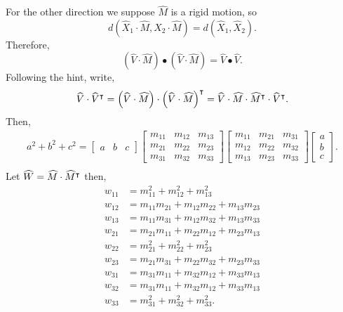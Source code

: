 \documentclass{ximera}
\begin{document}
\begin{problem}
\begin{freeResponse}
For the other direction we suppose $\hat{M}$ is a rigid motion, so
\[
 d\left( \hat{X}_{1}  \cdot\hat{M},\hat{X}_{2}
   \cdot\hat{M}\right) = d\left(  \hat{X}_{1},\hat{X}_{2}\right).
\]
Therefore, 
\[
	\left(  \hat{V}  \cdot\hat{M} \right) \bullet\left(
    \hat{V}  \cdot\hat{M}\right)  =\hat{V}\bullet\hat{V}.
 \]
Following the hint, write,
\[
\widehat{V}\cdot\widehat{V}^\intercal= \left(  \widehat{V}  \cdot\widehat{M} \right) \cdot\left(
    \widehat{V}  \cdot\widehat{M}\right)^\intercal  = \widehat{V} \cdot\widehat{M} \cdot \widehat{M}^\intercal \cdot \widehat{V}^\intercal .
\]
Then, 
\begin{align*}
a^2 + b^2 +c^2
=
\begin{bmatrix}
      a & b & c
    \end{bmatrix}
\begin{bmatrix}
	m_{11} & m_{12} & m_{13}\\
	m_{21} & m_{22} & m_{23}\\
	m_{31} & m_{32} & m_{33}
\end{bmatrix}
\begin{bmatrix}
	m_{11} & m_{21} & m_{31}\\
	m_{12} & m_{22} & m_{32}\\
	m_{13} & m_{23} & m_{33}
\end{bmatrix}
\begin{bmatrix}
      a \\
      b \\
      c
    \end{bmatrix}. \\
 \end{align*}
 Let $\widehat{W} = \widehat{M} \cdot \widehat{M}^\intercal$ then,
 \begin{align*}
 w_{11} &= m_{11}^2 + m_{12}^2 +  m_{13}^2 \\
 w_{12} &= m_{11}m_{21} + m_{12}m_{22} +m_{13}m_{23}\\
 w_{13} &= m_{11}m_{31} + m_{12}m_{32} +m_{13}m_{33}\\
 w_{21} &= m_{21}m_{11} + m_{22}m_{12} +m_{23}m_{13} \\
 w_{22} &= m_{21}^2 + m_{22}^2 +  m_{23}^2 \\
 w_{23} &=  m_{21}m_{31} + m_{22}m_{32} +m_{23}m_{33} \\
 w_{31} &= m_{31}m_{11} + m_{32}m_{12} +m_{33}m_{13} \\
 w_{32} &= m_{31}m_{11} + m_{32}m_{12} +m_{33}m_{13}\\
 w_{33} &= m_{31}^2 + m_{32}^2 +  m_{33}^2.
 \end{align*}    
   

\end{freeResponse}
\end{problem}
\end{document}

